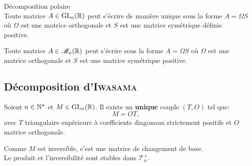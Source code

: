 \begin{theo}
    Décomposition polaire \\
    Toute matrice $A \in \mathrm{GL}_n(\mathbb{R})$ peut s'écrire de manière unique sous la forme $A = \Omega S$ où $\Omega$ est une matrice orthogonale et $S$ est une matrice symétrique définie positive. 
\end{theo}

\begin{corol}
    Toute matrice $A \in \mathscr{M}_n(\mathbb{R})$ peut s'écrire sous la forme $A = \Omega S$ où $\Omega$ est une matrice orthogonale et $S$ est une matrice symétrique positive.
\end{corol}

\subsection{Décomposition d'\textsc{Iwasama}}
\begin{prop}
    Soient $n \in \mathbb{N}^\star$ et $M \in \mathrm{GL}_n(\mathbb{R})$. Il existe un \textbf{unique} couple $(T, O)$ tel que:
    $$M = OT,$$
    avec $T$ triangulaire supérieure à coefficients diagonaux strictement positifs et $O$ matrice orthogonale. 
\end{prop}

Comme $M$ est inversible, c'est une matrice de changement de base. \\
Le produit et l'inversibilité sont stables dans $\mathscr{T}_n^+$.


